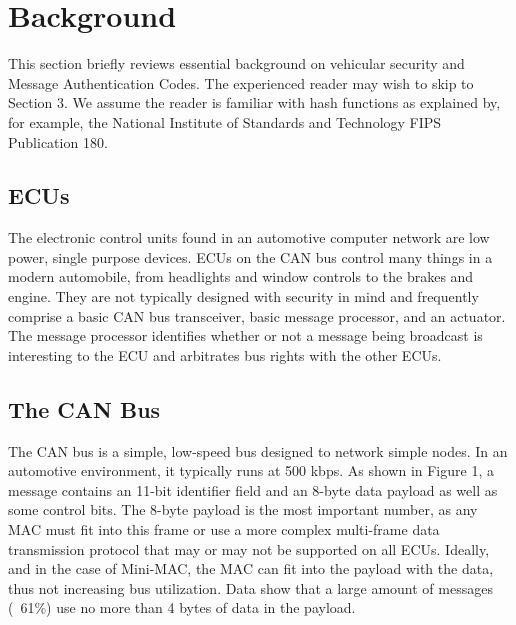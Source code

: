 \section{Background}

This section briefly reviews essential background on vehicular security and Message Authentication Codes. The experienced reader may wish to skip to Section 3. We assume the reader is familiar with hash functions as explained by, for example, the National Institute of Standards and Technology FIPS Publication 180\cite{FIPS-180-4}.

\subsection{ECUs}
The electronic control units found in an automotive computer network are low power, single purpose devices. ECUs on the CAN bus control many things in a modern automobile, from headlights and window controls to the brakes and engine. They are not typically designed with security in mind and frequently comprise a basic CAN bus transceiver, basic message processor, and an actuator. The message processor identifies whether or not a message being broadcast is interesting to the ECU and arbitrates bus rights with the other ECUs. %


\subsection{The CAN Bus}
The CAN bus is a simple, low-speed bus designed to network simple nodes. In an automotive environment, it typically runs at 500 kbps. As shown in Figure 1, a message contains an 11-bit identifier field and an 8-byte data payload as well as some control bits. The 8-byte payload is the most important number, as any MAC must fit into this frame or use a more complex multi-frame data transmission protocol that may or may not be supported on all ECUs. Ideally, and in the case of Mini-MAC, the MAC can fit into the payload with the data, thus not increasing bus utilization. Data show that a large amount of messages (~61\%) use no more than 4 bytes of data in the payload.

